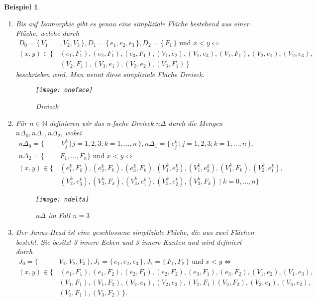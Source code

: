 \documentclass[12pt,titlepage,twoside,cleardoublepage]{article}
\theoremstyle{nummermitklammern}
\newtheorem{bsp}[temp]{Beispiel}
\newtheorem{bsp}[zahl]{Beispiel}
\numberwithin{equation}{section}
\begin{document}
 \begin{bsp}
 \begin{enumerate}
\item 
 Bis auf Isomorphie gibt es genau eine simpliziale Fläche bestehend aus einer Fläche, welche durch 
\begin{align*}
D_{0}=\{\,V_{1}&,V_{2},V_{3}\,\}, D_{1}=\{\,e_{1},e_{2},e_{3}\,\}, D_{2}=\{\,F_{1}\,\} \text{ und } x<y \Leftrightarrow \\
 (x,y)\in \{\,&(e_{1},F_{1}),(e_{2},F_{1}),(e_{3},F_{1}),(V_{1},e_{2}),(V_{1},e_{3}),(V_{1},F_{1}),(V_{2},e_{1}), (V_{2},e_{3}),\\ &(V_{2},F_{1}),
 (V_{3},e_{1}),(V_{3},e_{2}),(V_{3},F_{1})\,\} 
\end{align*} 
beschrieben wird. Man nennt diese simpliziale Fläche \emph{Dreieck}. 
\begin{figure}[H]
\begin{center}
\texttt{[image: oneface]}
\end{center}
\caption{Dreieck}
\end{figure}
 \item
 Für $n \in \mathbb{N}$ definieren wir das \emph{n-fache Dreieck} $n \Delta$ durch die Mengen $n\Delta_0, n\Delta_1,n\Delta_2$, wobei
 \begin{align*}
  n\Delta_0=\{& \,V_{j}^{k}\,\vert\, j=1,2,3 ;k=1,\ldots,n\,\}, n\Delta_1=\{\,e_{j}^{k}\,\vert\, j=1,2,3 ;k=1,\ldots,n\,\},\\
   n\Delta_2=\{&F_{1},\ldots,F_{n}\} \text{ und } x<y \Leftrightarrow \\
 (x,y)\in \{\,&(e_{1}^k,F_{k}),(e_{2}^k,F_{k}),(e_{3}^k,F_{k}),(V_{1}^k,e_{2}^k),(V_{1}^k,e_{3}^k),(V_{1}^k,F_{k}), (V_{2}^k,e_{1}^k),\\ &(V_{2}^k,e_{3}^k),(V_{2}^k,F_{k}),(V_{3}^k,e_{1}^k),(V_{3}^k,e_{2}^k),(V_{3}^k,F_{k})\mid k=0,\ldots,n\} 
\end{align*}
 \begin{figure}[H]
\begin{center}
\texttt{[image: ndelta]}
\end{center}
\caption{$n\Delta$ im Fall $n=3$}
\end{figure}
 \item 
 Der \emph{Janus-Head} ist eine geschlossene simpliziale Fläche, die aus zwei Flächen besteht. Sie besitzt 3 innere Ecken und 3 innere Kanten und wird definiert durch
 \begin{align*}
 J_{0}=\{\,&V_{1},V_{2},V_{3}\,\} ,J_{1}=\{\,e_{1},e_{2},e_{3}\,\},J_{2}=\{\, F_{1},F_{2}\,\}  \text{ und } x<y \Leftrightarrow \\
 (x,y)\in\{&\,(e_{1},F_{1}),(e_{1},F_{2}),(e_{2},F_{1}),(e_{2},F_{2}),(e_{3},F_{1}),(e_{3},F_{2}),(V_{1},e_{2}),(V_{1},e_{3}),\\ &(V_{1},F_{1}),
  (V_{1},F_{2}),(V_{2},e_{1}),(V_{2},e_{3}),(V_{2},F_{1})
 (V_{2},F_{2}), (V_{3},e_{1}), (V_{3},e_{2}),\\&(V_{3},F_{1}),(V_{3},F_{2}) \,\}.
 \end{align*}


\end{enumerate}
\end{bsp}
\end{document}
